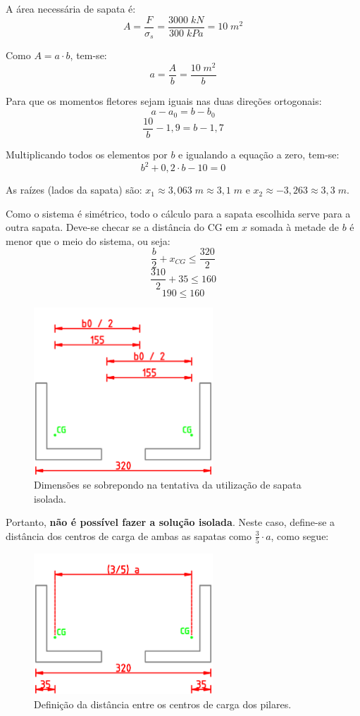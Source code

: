 A área necessária de sapata é:
$$A=\frac{F}{\sigma_s}=\frac{3000\;kN}{300\;kPa}=10\;m^2$$

Como $A=a\cdot b$, tem-se:
$$a=\frac{A}{b}=\frac{10\;m^2}{b}$$

Para que os momentos fletores sejam iguais nas duas direções ortogonais:
$$a-a_0=b-b_0$$
$$\frac{10}{b}-1,9=b-1,7$$

Multiplicando todos os elementos por $b$ e igualando a equação a zero, tem-se:
$$b^2+0,2\cdot b-10=0$$

As raízes (lados da sapata) são: $x_1\approx3,063\;m\approx3,1\;m$ e $x_2\approx-3,263\approx3,3\;m$.

Como o sistema é simétrico, todo o cálculo para a sapata escolhida serve para a outra sapata. Deve-se checar se a distância do CG em $x$ somada à metade de $b$ é menor que o meio do sistema, ou seja:
$$\frac{b}{2}+x_{CG}\leqslant\frac{320}{2}$$
$$\frac{310}{2}+35\leqslant160$$
$$190\leqslant160$$
\begin{figure}[H]
	\begin{center}
	\caption{Dimensões se sobrepondo na tentativa da utilização de sapata isolada.}
    	\includegraphics[width=0.6\textwidth]{Fundacoes-rasas-ou-diretas/Imagens/Exercicio-1-Sapata-conjugada-parte4.png}
	\end{center}
\end{figure}

Portanto, \textbf{não é possível fazer a solução isolada}. Neste caso, define-se a distância dos centros de carga de ambas as sapatas como $\frac{3}{5}\cdot a$, como segue:
\begin{figure}[H]
	\begin{center}
	\caption{Definição da distância entre os centros de carga dos pilares.}
    	\includegraphics[width=0.6\textwidth]{Fundacoes-rasas-ou-diretas/Imagens/Exercicio-1-Sapata-conjugada-parte5.png}
	\end{center}
\end{figure}

